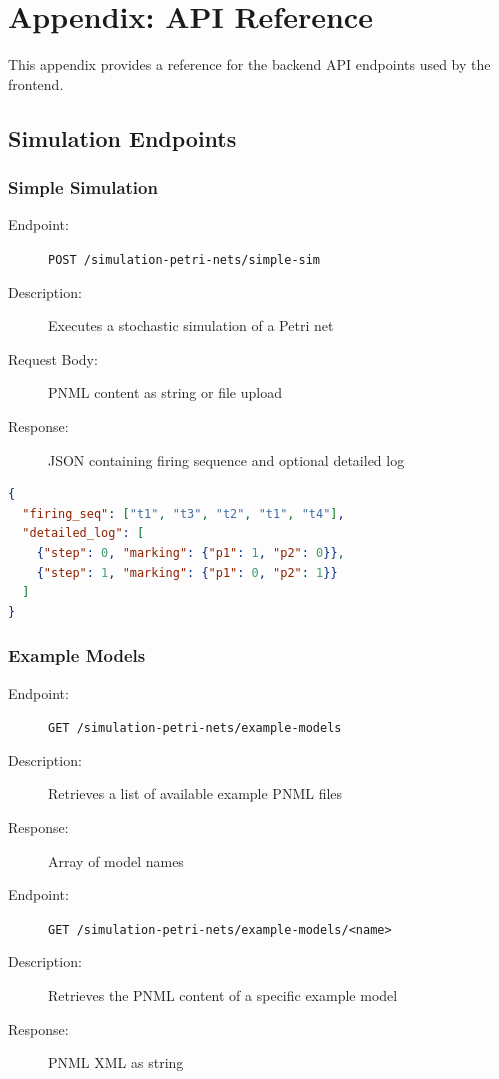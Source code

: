 \chapter{Appendix: API Reference}
\label{chap:appendix-a}

This appendix provides a reference for the backend API endpoints used by the frontend.

\section{Simulation Endpoints}
\label{sec:simulation-endpoints}

\subsection{Simple Simulation}

\begin{description}
    \item[Endpoint:] \texttt{POST /simulation-petri-nets/simple-sim}
    \item[Description:] Executes a stochastic simulation of a Petri net
    \item[Request Body:] PNML content as string or file upload
    \item[Response:] JSON containing firing sequence and optional detailed log
\end{description}

\begin{lstlisting}[language=json, caption={Example response from simple-sim}]
{
  "firing_seq": ["t1", "t3", "t2", "t1", "t4"],
  "detailed_log": [
    {"step": 0, "marking": {"p1": 1, "p2": 0}},
    {"step": 1, "marking": {"p1": 0, "p2": 1}}
  ]
}
\end{lstlisting}

\subsection{Example Models}

\begin{description}
    \item[Endpoint:] \texttt{GET /simulation-petri-nets/example-models}
    \item[Description:] Retrieves a list of available example PNML files
    \item[Response:] Array of model names
\end{description}

\begin{description}
    \item[Endpoint:] \texttt{GET /simulation-petri-nets/example-models/<name>}
    \item[Description:] Retrieves the PNML content of a specific example model
    \item[Response:] PNML XML as string
\end{description}

